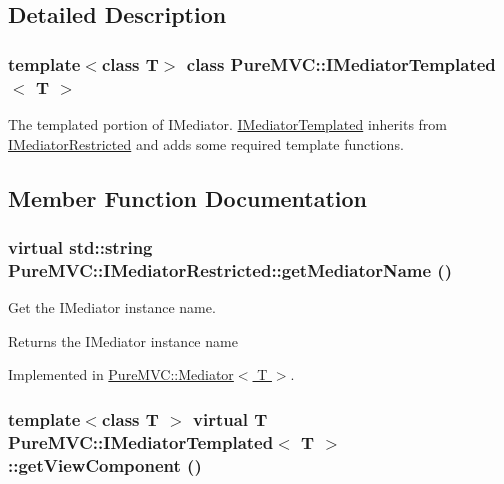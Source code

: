 \subsection{Detailed Description}
\subsubsection*{template$<$class T$>$ class PureMVC::IMediatorTemplated$<$ T $>$}

The templated portion of IMediator. \hyperlink{class_pure_m_v_c_1_1_i_mediator_templated}{IMediatorTemplated} inherits from \hyperlink{class_pure_m_v_c_1_1_i_mediator_restricted}{IMediatorRestricted} and adds some required template functions. 

\subsection{Member Function Documentation}
\hypertarget{class_pure_m_v_c_1_1_i_mediator_restricted_a763c71cd6446cb09c2eb55ad91ca28ca}{
\subsubsection[{getMediatorName}]{\setlength{\rightskip}{0pt plus 5cm}virtual std::string PureMVC::IMediatorRestricted::getMediatorName ()}}
\label{class_pure_m_v_c_1_1_i_mediator_restricted_a763c71cd6446cb09c2eb55ad91ca28ca}


Get the {\ttfamily IMediator} instance name. \begin{DoxyReturn}{Returns}
the {\ttfamily IMediator} instance name 
\end{DoxyReturn}


Implemented in \hyperlink{class_pure_m_v_c_1_1_mediator_aa199b499fc1cfae9b49b8336679787a8}{PureMVC::Mediator$<$ T $>$}.\hypertarget{class_pure_m_v_c_1_1_i_mediator_templated_a985393a359ef8643a577b34e81374dc6}{
\subsubsection[{getViewComponent}]{\setlength{\rightskip}{0pt plus 5cm}template$<$class T $>$ virtual T {\bf PureMVC::IMediatorTemplated}$<$ T $>$::getViewComponent ()}}
\label{class_pure_m_v_c_1_1_i_mediator_templated_a985393a359ef8643a577b34e81374dc6}


